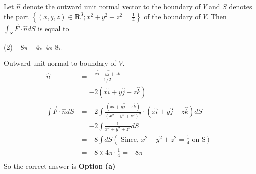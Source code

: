 \begin{enumerate}
	Let $\hat{n}$ denote the outward unit normal vector to the boundary of $V$ and $S$ denotes the part $\left\{(x, y, z) \in \boldsymbol{R}^{3} ; x^{2}+y^{2}+z^{2}=\frac{1}{4}\right\}$ of the boundary of $V$. Then $\int_{S} \vec{F} \cdot \hat{n} d S$ is equal to
	 \begin{tasks}(2)
		\task[\textbf{a.}]$-8 \pi$
		\task[\textbf{b.}]$-4 \pi$
		\task[\textbf{c.}] $4 \pi$
		\task[\textbf{d.}] $8 \pi$
	\end{tasks}
	\begin{answer}
		Outward unit normal to boundary of $V$.
		\begin{align*}
		\hat{n} &=-\frac{x \hat{i}+y \hat{j}+z \hat{k}}{1 / 2} \\ &=-2(x \hat{i}+y \hat{j}+z \hat{k}) \\ \int \vec{F} \cdot \hat{n} d S &=-2 \int \frac{(x \hat{i}+y \hat{j}+z \hat{k})}{\left(x^{2}+y^{2}+z^{2}\right)^{2}} \cdot(x \hat{i}+y \hat{j}+z \hat{k}) d S \\
		&=-2 \int \frac{1}{x^{2}+y^{2}+z^{2}} d S\\
		&=-8 \int d S \left(\right.\text{ Since, }x^{2}+y^{2}+z^{2}=\frac{1}{4}\text{ on }\left.\mathrm{S}\right)\\
		&=-8 \times 4 \pi \cdot \frac{1}{4}=-8 \pi\\
		\end{align*}
			So the correct answer is \textbf{Option (a)}
	\end{answer}
	
	
	
	
	
	
	
	
	
	
	
	
\end{enumerate}